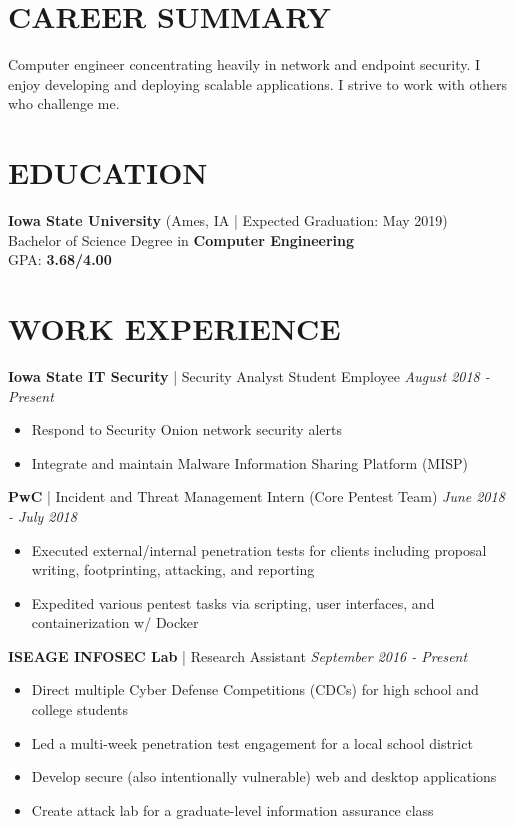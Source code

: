 \documentclass[line]{res}
\begin{document}
\address{(630) 450-0012\\dlimanow@iastate.edu\\Ames, Iowa}

\begin{resume}
\section{CAREER SUMMARY}
Computer engineer concentrating heavily in network and endpoint security. I enjoy developing and deploying scalable applications. I strive to work with others who challenge me.

\section{EDUCATION}
\textbf{Iowa State University} (Ames, IA | Expected Graduation: May 2019)\\
Bachelor of Science Degree in \textbf{Computer Engineering}\\
GPA: \textbf{3.68/4.00}

\section{WORK EXPERIENCE}
\textbf{Iowa State IT Security} | Security Analyst Student Employee \hfill \textit{August 2018 - Present}
\begin{itemize}
	\item Respond to Security Onion network security alerts
	\item Integrate and maintain Malware Information Sharing Platform (MISP)
\end{itemize}
\textbf{PwC} | Incident and Threat Management Intern (Core Pentest Team) \hfill \textit{June 2018 - July 2018}
\begin{itemize}
	\item Executed external/internal penetration tests for clients including proposal writing, footprinting, attacking, and reporting
	\item Expedited various pentest tasks via scripting, user interfaces, and containerization w/ Docker
\end{itemize}

\textbf{ISEAGE INFOSEC Lab} | Research Assistant \hfill \textit{September 2016 - Present}
\begin{itemize}
	\item Direct multiple Cyber Defense Competitions (CDCs) for high school and college students
	\item Led a multi-week penetration test engagement for a local school district
	\item Develop secure (also intentionally vulnerable) web and desktop applications
	\item Create attack lab for a graduate-level information assurance class
\end{itemize}


\end{resume}
\end{document}
